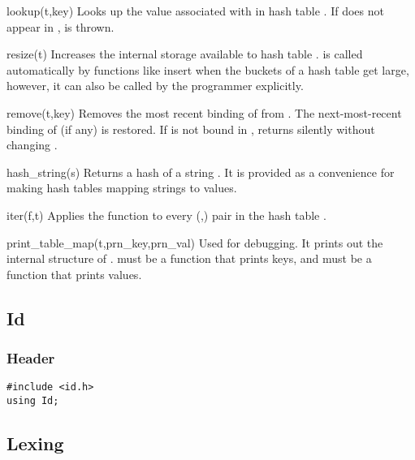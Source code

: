 \begin{defun}{lookup}{(t,key)}
Looks up the value associated with  in hash table .  If
 does not appear in ,  is thrown.
\end{defun}


\begin{defun}{resize}{(t)}
Increases the internal storage available to hash table .
 is called automatically by functions like insert when the
buckets of a hash table get large, however, it can also be called by the
programmer explicitly.
\end{defun}

\begin{defun}{remove}{(t,key)}
Removes the most recent binding of  from .  The
next-most-recent binding of  (if any) is restored.  If
 is not bound in ,  returns silently
without changing .
\end{defun}


\begin{defun}{hash_string}{(s)}
Returns a hash of a string .  It is provided as a convenience for
making hash tables mapping strings to values.
\end{defun}

\begin{defun}{iter}{(f,t)}
Applies the function  to every (,) pair in
the hash table .
\end{defun}

\begin{defun}{print_table_map}{(t,prn_key,prn_val)}
Used for debugging.  It prints out the internal structure of .
 must be a function that prints keys, and 
must be a function that prints values.
\end{defun}

\subsection{Id}

\subsubsection*{Header}
\begin{verbatim}
#include <id.h>
using Id;
\end{verbatim}

\subsection{Lexing}

